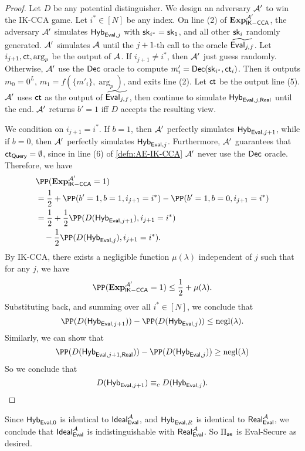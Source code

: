 \begin{proof}
    Let $D$ be any potential distinguisher. We design an adversary $\mathcal{A}'$ to win the IK-CCA game. Let $i^* \in [N]$ be any index. On line (2) of $\mathbf{Exp}_{\mathsf{IK-CCA}}^{\mathcal{A}'}$, the adversary $\mathcal{A}'$ simulates $\mathsf{Hyb}_{\mathsf{Eval}, j}$ with ${\mathsf{sk}}_{i^*} = {\mathsf{sk}}_1$, and all other ${\mathsf{sk}}_i$ randomly generated. $\mathcal{A}'$ simulates $\mathcal{A}$ until the $j + 1$-th call to the oracle $\widetilde{\mathsf{Eval}_{j, f}}$. Let $i_{j + 1}, \mathsf{ct}, \arg_p$ be the output of $\mathcal{A}$. If $i_{j + 1} \neq i^*$, then $\mathcal{A}'$ just guess randomly. Otherwise, $\mathcal{A}'$ use the $\mathsf{Dec}$ oracle to compute $m'_i = \mathsf{Dec}({\mathsf{sk}}_{i^*}, \mathsf{ct}_i)$. Then it outputs $m_0 = 0^L$, $m_1 = f(\{m'_i\}, \arg_p)$, and exits line (2). Let $\mathsf{ct}$ be the output line (5). $\mathcal{A}'$ uses $\mathsf{ct}$ as the output of $\widetilde{\mathsf{Eval}_{j, f}}$, then continue to simulate $\mathsf{Hyb}_{\mathsf{Eval}, j, \mathsf{Real}}$ until the end. $\mathcal{A}'$ returns $b' = 1$ iff $D$ accepts the resulting view.

    We condition on $i_{j + 1} = i^*$. If $b = 1$, then $\mathcal{A}'$ perfectly simulates $\mathsf{Hyb}_{\mathsf{Eval}, j + 1}$, while if $b = 0$, then $\mathcal{A}'$ perfectly simulates $\mathsf{Hyb}_{\mathsf{Eval}, j}$. Furthermore, $\mathcal{A}'$ guarantees that $\mathsf{ct}_{\mathsf{Query}} = \emptyset$, since in line (6) of \cref{defn:AE-IK-CCA} $\mathcal{A}'$ never use the $\mathsf{Dec}$ oracle. Therefore, we have
    \begin{align*}
     &\PP(\mathbf{Exp}_{\mathsf{IK-CCA}}^{\cA'} = 1) \\
     &= \frac{1}{2} + \PP(b' = 1, b = 1, i_{j + 1} = i^*) - \PP(b' = 1, b = 0, i_{j + 1} = i^*) \\   
     &= \frac{1}{2} + \frac{1}{2}\PP(D(\Hyb_{\Eval, j + 1}), i_{j + 1} = i^*)  \\
     & \quad - \frac{1}{2} \PP(D(\Hyb_{\Eval, j}), i_{j + 1} = i^*).
    \end{align*}
    By IK-CCA, there exists a negligible function $\mu(\lambda)$ independent of $j$ such that for any $j$, we have
    $$\PP(\mathbf{Exp}_\mathsf{IK-CCA}^{\cA'} = 1) \leq \frac{1}{2} + \mu(\lambda).$$
    Substituting back, and summing over all $i^* \in [N]$, we conclude that
    $$\PP(D(\Hyb_{\Eval, j + 1})) - \PP(D(\Hyb_{\Eval, j})) \leq \negl(\lambda).$$
    Similarly, we can show that
    $$\PP(D(\Hyb_{\Eval, j + 1, \Real})) - \PP(D(\Hyb_{\Eval, j})) \geq \negl(\lambda)$$
    So we conclude that
    $$D(\mathsf{Hyb}_{\mathsf{Eval}, j + 1}) \equiv_c D(\mathsf{Hyb}_{\mathsf{Eval}, j}).$$
\end{proof}
Since $\mathsf{Hyb}_{\mathsf{Eval}, 0}$ is identical to $\mathsf{Ideal}_{\mathsf{Eval}}^{\mathcal{A}}$, and $\mathsf{Hyb}_{\mathsf{Eval}, R}$ is identical to $\mathsf{Real}_{\mathsf{Eval}}^{\mathcal{A}}$, we conclude that $\mathsf{Ideal}_{\mathsf{Eval}}^{\mathcal{A}}$ is indistinguishable with $\mathsf{Real}_{\mathsf{Eval}}^{\mathcal{A}}$. So $\Pi_{\mathsf{ae}}$ is Eval-Secure as desired.

